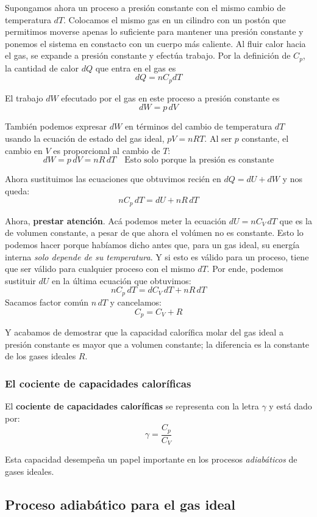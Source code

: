 \documentclass[12pt]{article}
\begin{document}
  Supongamos ahora un proceso a presión constante con el mismo cambio de temperatura $ dT $. Colocamos el mismo gas en un cilindro con un postón que permitimos moverse apenas lo suficiente para mantener una presión constante y ponemos el sistema en constacto con un cuerpo más caliente. Al fluir calor hacia el gas, se expande a presión constante y efectúa trabajo. Por la definición de $ C_{p} $, la cantidad de calor $ dQ $ que entra en el gas es 
  \[
    dQ = nC_{p}dT
  \]

  El trabajo $ dW $ efecutado por el gas en este proceso a presión constante es 
  \[
    dW = p\,dV
  \]

  También podemos expresar $ dW $ en términos del cambio de temperatura $ dT $ usando la ecuación de estado del gas ideal, $ pV = nRT $. Al ser $ p $ constante, el cambio en $ V $ es proporcional al cambio de $ T $:
  \[
  dW = p\,dV = nR\,dT \quad \text{Esto solo porque la presión es constante}
  \]

  Ahora sustituimos las ecuaciones que obtuvimos recién en $ dQ = dU + dW $ y nos queda:
  \[
  nC_{p}\,dT = dU + nR\,dT
  \]

  Ahora, \textbf{prestar atención}. Acá podemos meter la ecuación $ dU = nC_{V}\,dT $ que es la de volumen constante, a pesar de que ahora el volúmen no es constante. Esto lo podemos hacer porque habíamos dicho antes que, para un gas ideal, su energía interna \textit{solo depende de su temperatura}. Y si esto es válido para un proceso, tiene que ser válido para cualquier proceso con el mismo $ dT $. Por ende, podemos sustituir $ dU $ en la última ecuación que obtuvimos:
  \[
    nC_{p}\,dT = dC_{V}\,dT + nR\,dT
  \]
  Sacamos factor común $ n\,dT $ y cancelamos:
  \[
    C_{p} = C_{V} + R
  \]

  Y acabamos de demostrar que la capacidad calorífica molar del gas ideal a presión constante es mayor que a volumen constante; la diferencia es la constante de los gases ideales $ R $.

  \subsubsection{El cociente de capacidades caloríficas}
  El \textbf{cociente de capacidades caloríficas} se representa con la letra $ \gamma $ y está dado por:
  \[
  \gamma = \frac{C_{p}}{C_{V}}
  \]

  Esta capacidad desempeña un papel importante en los procesos \textit{adiabáticos} de gases ideales.

  \subsection{Proceso adiabático para el gas ideal}
\end{document}
